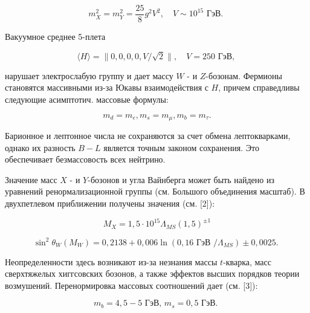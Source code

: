 \documentclass[10pt]{article}
\begin{document}
\[

m_{X}^{2}=m_{Y}^{2}=\frac{25}{8} g^{2} V^{2}, \quad V \sim 10^{15} \text { ГэВ. }

\]



Вакуумное среднее 5-плета



\[

\langle H\rangle=\|0,0,0,0, V / \sqrt{2}\|, \quad V=250 \text { ГэВ, }

\]



нарушает электрослабую группу и дает массу $W$ - и $Z$-бозонам. Фермионы становятся массивными из-за Юкавы взаимодействия с $H$, причем справедливы следующие асимптотич. массовые формулы:



\[

m_{d}=m_{e}, m_{s}=m_{\mu}, m_{b}=m_{\tau} .

\]



Барионное и лептонное числа не сохраняются за счет обмена лептокварками, однако их разность $B-L$ является точным законом сохранения. Это обеспечивает безмассовость всех нейтрино.



Значение масс $X$ - и $Y$-бозонов и угла Вайнберга может быть найдено из уравнений ренормализационной группы (см. Большого объединения масштаб). В двухпетлевом приближении получены значения (см. [2]):



\[

M_{X}=1,5 \cdot 10^{15} \Lambda_{M S}(1,5)^{ \pm 1}

\]



\[

\sin ^{2} \theta_{W}\left(M_{W}\right)=0,2138+0,006 \ln \left(0,16 \text { ГэВ } / \Lambda_{M S}\right) \pm 0,0025 \text {. }

\]



Неопределенности здесь возникают из-за незнания массы $t$-кварка, масс сверхтяжелых хиггсовских бозонов, а также эффектов высших порядков теории возмушений. Перенормировка массовых соотношений дает (см. [3]):



\[

m_{b}=4,5-5 \text { ГэВ, } m_{s}=0,5 \text { ГэВ. }

\]
\end{document}
